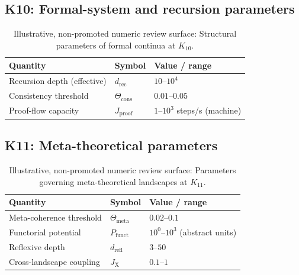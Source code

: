 
\subsection*{K10: Formal-system and recursion parameters}

\begin{table}[htbp]
  \centering
  \caption{Illustrative, non-promoted numeric review surface: Structural parameters of formal continua at \(K_{10}\).}
  \label{tab:k10-formal-parameters}
  \begin{tabular}{@{}L{0.44\textwidth}L{0.16\textwidth}L{0.23\textwidth}@{}}
    \hline
    Quantity & Symbol & Value / range \\
    \hline
    Recursion depth (effective) & \(d_\mathrm{rec}\)
        & \(10\text{–}10^4\) \\
    Consistency threshold & \(\Theta_\mathrm{cons}\)
        & \(0.01\text{–}0.05\) \\
    Proof-flow capacity & \(J_\mathrm{proof}\)
        & \(1\text{–}10^3\) steps/s (machine) \\
    \hline
  \end{tabular}
\end{table}


\subsection*{K11: Meta-theoretical parameters}

\begin{table}[htbp]
  \centering
  \caption{Illustrative, non-promoted numeric review surface: Parameters governing meta-theoretical landscapes at \(K_{11}\).}
  \label{tab:k11-meta-parameters}
  \begin{tabular}{@{}L{0.44\textwidth}L{0.16\textwidth}L{0.23\textwidth}@{}}
    \hline
    Quantity & Symbol & Value / range \\
    \hline
    Meta-coherence threshold & \(\Theta_\mathrm{meta}\)
        & \(0.02\text{–}0.1\) \\
    Functorial potential & \(P_\mathrm{funct}\)
        & \(10^0\text{–}10^3\) (abstract units) \\
    Reflexive depth & \(d_\mathrm{refl}\)
        & \(3\text{–}50\) \\
    Cross-landscape coupling & \(J_\mathrm{X}\)
        & \(0.1\text{–}1\) \\
    \hline
  \end{tabular}
\end{table}


